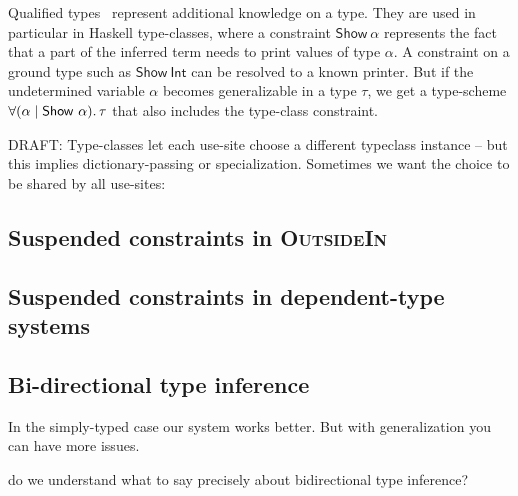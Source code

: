 \documentclass[acmsmall,screen,nonacm]{acmart}
\begin{document}
Qualified types~\citep*{TODO} represent additional knowledge on a type. They
are used in particular in Haskell type-classes, where a constraint
$\mathsf{Show}~\alpha$ represents the fact that a part of the inferred term
needs to print values of type $\alpha$. A constraint on a ground type such
as $\mathsf{Show}~\mathsf{Int}$ can be resolved to a known printer. But if
the undetermined variable $\alpha$ becomes generalizable in a type $\tau$,
we get a type-scheme $\forall {(\alpha \mid \mathsf{Show}~\alpha)}.\,{\tau}$ that
also includes the type-class constraint.

DRAFT: Type-classes let each use-site choose a different typeclass instance
-- but this implies dictionary-passing or specialization. Sometimes we want
the choice to be shared by all use-sites:


\subsection{Suspended constraints in \textsc{OutsideIn}}


\subsection{Suspended constraints in dependent-type systems}


\subsection{Bi-directional type inference}


In the simply-typed case our system works better. But with generalization
you can have more issues.




\TODO
{do we understand what to say precisely about bidirectional type inference?}
\end{document}
